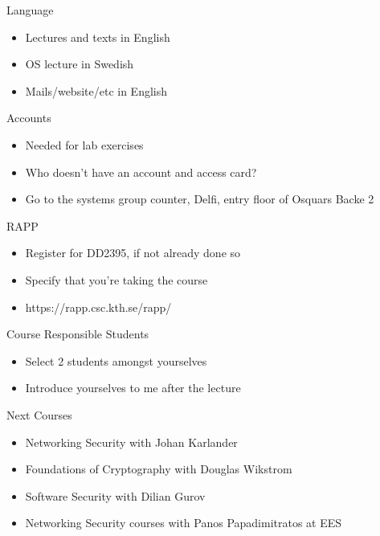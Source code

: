 \documentclass{beamer}
\begin{document}
\begin{frame}{Language}
  \begin{itemize}
  \item Lectures and texts in English
  \item OS lecture in Swedish
  \item Mails/website/etc in English
  \end{itemize}
\end{frame}

\begin{frame}{Accounts}
  \begin{itemize}
  \item Needed for lab exercises
  \item Who doesn't have an account and access card?
  \item Go to the systems group counter, Delfi, entry 
floor of Osquars Backe 2
  \end{itemize}
\end{frame}

\begin{frame}{RAPP}
  \begin{itemize}
    \item Register for DD2395, if not already done so 
    \item Specify that you're taking the course 
    \item https://rapp.csc.kth.se/rapp/
  \end{itemize}
\end{frame}
 
\begin{frame}{Course Responsible Students }
  \begin{itemize}
  \item Select 2 students amongst yourselves 
  \item Introduce yourselves to me after the lecture 
  \end{itemize}
\end{frame}


\begin{frame}{Next Courses}
  \begin{itemize}
  \item Networking Security with Johan Karlander
  \item Foundations of Cryptography with Douglas Wikstr\:om
  \item Software Security with Dilian Gurov
  \item Networking Security courses with Panos
    Papadimitratos at EES
  \end{itemize}
\end{frame}
\end{document}
